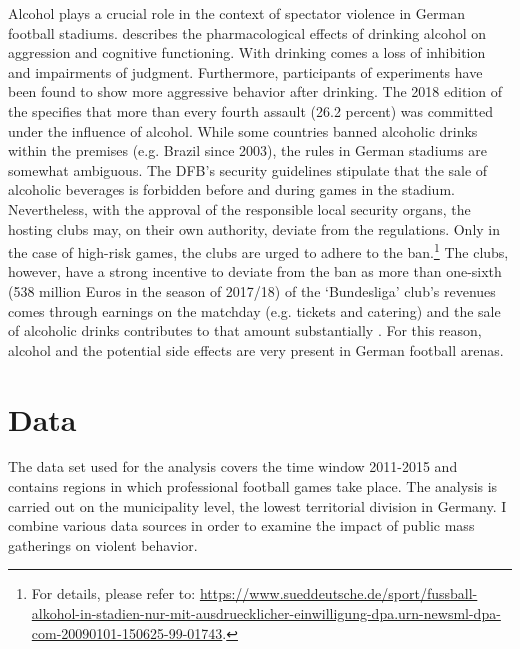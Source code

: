 Alcohol plays a crucial role in the context of spectator violence in German football stadiums. \cite{cook2013virtuous} describes the pharmacological effects of drinking alcohol on aggression and cognitive functioning. With drinking comes a loss of inhibition and impairments of judgment. Furthermore, participants of experiments have been found to show more aggressive behavior after drinking. The 2018 edition of the \citeauthor{PCS2018} specifies that more than every fourth assault (26.2 percent) was committed under the influence of alcohol. While some countries banned alcoholic drinks within the premises (e.g. Brazil since 2003), the rules in German stadiums are somewhat ambiguous. The DFB's security guidelines stipulate that the sale of alcoholic beverages is forbidden before and during games in the stadium. Nevertheless, with the approval of the responsible local security organs, the hosting clubs may, on their own authority, deviate from the regulations. Only in the case of high-risk games, the clubs are urged to adhere to the ban.\footnote{For details, please refer to: \href{https://www.sueddeutsche.de/sport/fussball-alkohol-in-stadien-nur-mit-ausdruecklicher-einwilligung-dpa.urn-newsml-dpa-com-20090101-150625-99-01743}{https://www.sueddeutsche.de/sport/fussball-alkohol-in-stadien-nur-mit-ausdruecklicher-einwilligung-dpa.urn-newsml-dpa-com-20090101-150625-99-01743}.} The clubs, however, have a strong incentive to deviate from the ban as more than one-sixth (538 million Euros in the season of 2017/18) of the `Bundesliga' club's revenues comes through earnings on the matchday (e.g. tickets and catering) and the sale of alcoholic drinks contributes to that amount substantially \citep{deloitte2019report}. For this reason, alcohol and the potential side effects are very present in German football arenas.





\bigskip
\section{Data}\label{sec_soc_ext:data} 
The data set used for the analysis covers the time window 2011-2015 and contains regions in which professional football games take place. The analysis is carried out on the municipality level, the lowest territorial division in Germany. I combine various data sources in order to examine the impact of public mass gatherings on violent behavior.



